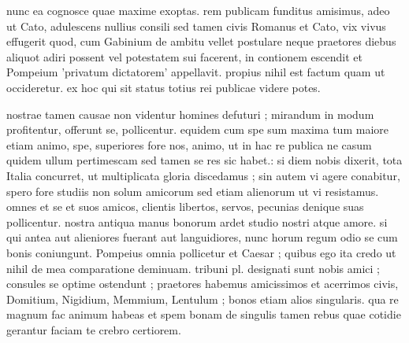  nunc ea cognosce quae maxime exoptas. rem publicam funditus amisimus, adeo ut Cato, adulescens nullius consili sed tamen civis Romanus et Cato, vix vivus effugerit quod, cum Gabinium de ambitu vellet postulare neque praetores diebus aliquot adiri possent vel potestatem sui facerent, in contionem escendit et Pompeium 'privatum dictatorem' appellavit. propius nihil est factum quam ut occideretur. ex hoc qui sit status totius rei publicae videre potes.

 nostrae tamen causae non videntur homines defuturi ; mirandum in modum profitentur, offerunt se, pollicentur. equidem cum spe sum maxima tum maiore etiam animo, spe, superiores fore nos, animo, ut in hac re publica ne casum quidem ullum pertimescam sed tamen se res sic habet.: si diem nobis dixerit, tota Italia concurret, ut multiplicata gloria discedamus ; sin autem vi agere conabitur, spero fore studiis non solum amicorum sed etiam alienorum ut vi resistamus. omnes et se et suos amicos, clientis libertos, servos, pecunias denique suas pollicentur. nostra antiqua manus bonorum ardet studio nostri atque amore. si qui antea aut alieniores fuerant aut languidiores, nunc horum regum odio se cum bonis coniungunt. Pompeius omnia pollicetur et Caesar ; quibus ego ita credo ut nihil de mea comparatione deminuam. tribuni pl. designati sunt nobis amici ; consules se optime ostendunt ; praetores habemus amicissimos et acerrimos civis, Domitium, Nigidium, Memmium, Lentulum ; bonos etiam alios singularis. qua re magnum fac animum habeas et spem bonam de singulis tamen rebus quae cotidie gerantur faciam te crebro certiorem.
